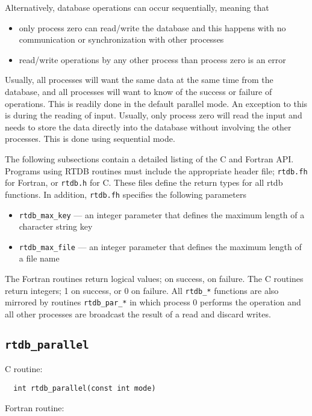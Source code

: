 Alternatively, database operations can occur sequentially, meaning
that
\begin{itemize}
\item only process zero can read/write the database and this happens
  with no communication or synchronization with other processes
\item read/write operations by any other process than process zero is
  an error
\end{itemize}

Usually, all processes will want the same data at the same time from
the database, and all processes will want to know of the success or
failure of operations.  This is readily done in the default parallel
mode.  An exception to this is during the reading of input.
Usually, only process zero will read the input and needs to store the
data directly into the database without involving the other processes.
This is done using sequential mode.

The following subsections contain a detailed listing of the C and Fortran API.  
Programs using RTDB routines must include the appropriate header file; 
{\tt rtdb.fh} for Fortran, or {\tt rtdb.h} for C.   These files define the return
types for all rtdb functions.  In addition, {\tt rtdb.fh} specifies the 
following parameters 
\begin{itemize}
\item {\tt rtdb\_max\_key} --- an integer parameter that defines the maximum
  length of a character string key
\item {\tt rtdb\_max\_file} --- an integer parameter that defines the maximum
  length of a file name
\end{itemize}
The Fortran routines return logical values; \TRUE on success, \FALSE 
on failure.  The C routines return integers; 1 on success, or 0 on failure.
All \verb+rtdb_*+ functions are also mirrored by routines \verb+rtdb_par_*+
in which process 0 performs the operation and all other processes
are broadcast the result of a read and discard writes.


\subsection{{\tt rtdb\_parallel}}

C routine:

\begin{verbatim}
  int rtdb_parallel(const int mode)
\end{verbatim}


Fortran routine:

